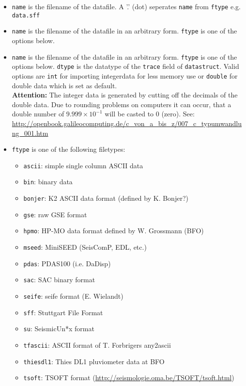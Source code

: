 \documentclass[10pt, a4paper, titlepage=false]{scrartcl}
\begin{document}
\begin{itemize}
\item \texttt{name} is the filename of the datafile. A '.' (dot) seperates
\texttt{name} from \texttt{ftype} e.g. \texttt{data.sff}
\item \texttt{name} is the filename of the datafile in an arbitrary form.
\texttt{ftype} is one of the options below.
\item \texttt{name} is the filename of the datafile in an arbitrary form.
\texttt{ftype} is one of the options below. \texttt{dtype} is the datatype of
the \texttt{trace} field of \texttt{datastruct}. Valid options are
\texttt{int} for importing integerdata for less memory use or \texttt{double}
for double data which is set as default.\\
\textbf{Attention:} The integer data is generated by cutting off the decimals of
the double data. Due to rounding problems on computers it can occur, that a
double number of $9.999\times10^{-1}$ will be casted to $0$ (zero).
See:
\url{http://openbook.galileocomputing.de/c\_von\_a\_bis\_z/007\_c\_typumwandlung\_001.htm}
\item \texttt{ftype} is one of the following filetypes:
\begin{itemize}
\item \texttt{ascii}: simple single column ASCII data
\item \texttt{bin}: binary data
\item \texttt{bonjer}: K2 ASCII data format (defined by K. Bonjer?)
\item \texttt{gse}: raw GSE format
\item \texttt{hpmo}: HP-MO data format defined by W. Grossmann (BFO)
\item \texttt{mseed}: MiniSEED (SeisComP, EDL, etc.)
\item \texttt{pdas}: PDAS100 (i.e. DaDisp)
\item \texttt{sac}: SAC binary format
\item \texttt{seife}: seife format (E. Wielandt)
\item \texttt{sff}: Stuttgart File Format
\item \texttt{su}: SeismicUn*x format
\item \texttt{tfascii}: ASCII format of T. Forbrigers any2ascii
\item \texttt{thiesdl1}: Thies DL1 pluviometer data at BFO
\item \texttt{tsoft}: TSOFT format
(\url{http://seismologie.oma.be/TSOFT/tsoft.html})
\end{itemize}

\end{itemize}
\end{document}
